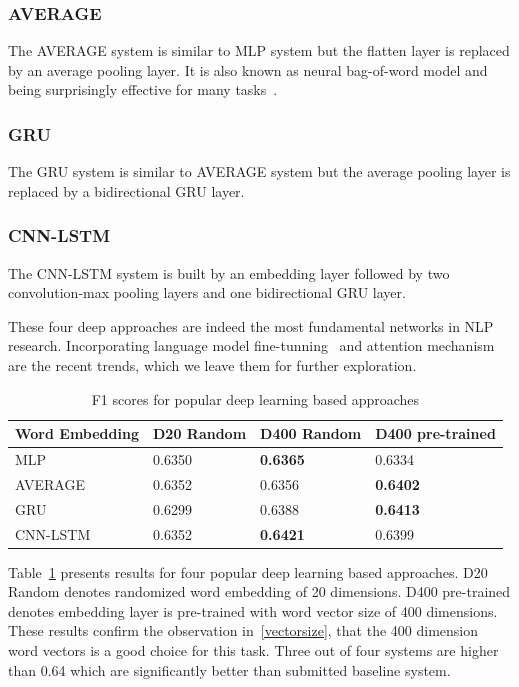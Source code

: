\documentclass[11pt]{article}
\begin{document}
\subsubsection{AVERAGE}
The AVERAGE system is similar to MLP system but the flatten layer is replaced by an average pooling layer. It is also known as neural bag-of-word model and being surprisingly effective for many tasks~\cite{Iyyer2015Deep}. 
\subsubsection{GRU}  
The GRU system is similar to AVERAGE system but the average pooling layer is replaced by a bidirectional GRU layer.
\subsubsection{CNN-LSTM} 
The CNN-LSTM system is built by an embedding layer followed by two convolution-max pooling layers and one bidirectional GRU layer.

These four deep approaches are indeed the most fundamental networks in NLP research. Incorporating language model fine-tunning~\cite{2018arXiv180106146H} and attention mechanism~\cite{Vaswani2017Attention} are the recent trends, which we leave them for further exploration.

\begin{table}[h]
	\centering
	
	
	\begin{tabular}{|l|l|l|l|}
		\hline
		Word Embedding & D20 Random & D400 Random & D400 pre-trained \\ \hline
		MLP & 0.6350 & \textbf{0.6365} & 0.6334 \\ \hline
		AVERAGE   & 0.6352      & 0.6356               & \textbf{0.6402}       \\ \hline
		GRU & 0.6299 & 0.6388 & \textbf{0.6413} \\ \hline
		CNN-LSTM & 0.6352 & \textbf{0.6421}  & 0.6399 \\ \hline
	\end{tabular}
	\caption{F1 scores for popular deep learning based approaches}
	\label{4deepnets}
\end{table}

Table~\ref{4deepnets} presents results for four popular deep learning based approaches. D20 Random denotes randomized word embedding of 20 dimensions. D400 pre-trained denotes embedding layer is pre-trained with word vector size of 400 dimensions. These results confirm the observation in~\ref{vectorsize}, that the 400 dimension word vectors is a good choice for this task. Three out of four systems are higher than 0.64 which are significantly better than submitted baseline system.
\end{document}
